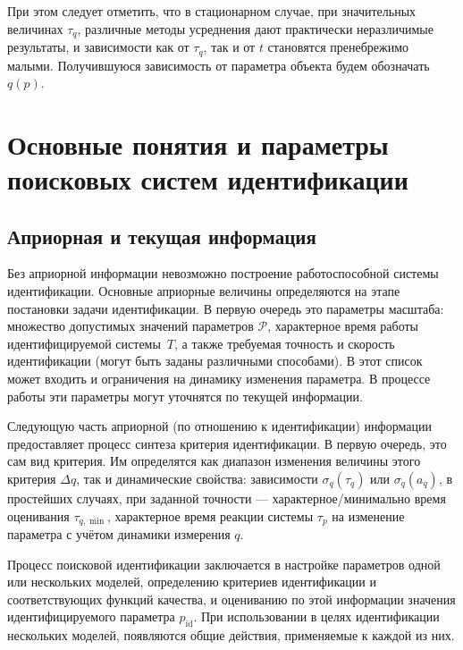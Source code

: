 При этом следует отметить, что в стационарном случае, при значительных величинах $\tau_q$,
различные методы усреднения дают практически неразличимые результаты, и зависимости
как от $\tau_q$, так и от $t$ становятся пренебрежимо малыми.
Получившуюся зависимость от параметра объекта будем обозначать $q(p)$.







\section{Основные понятия и параметры поисковых систем идентификации}  %

\subsection{Априорная и текущая информация}  %

Без априорной информации невозможно построение
работоспособной системы идентификации. Основные
априорные величины определяются на этапе постановки
задачи идентификации. В первую очередь это
параметры масштаба: множество допустимых
значений параметров \label{atu:d:p_set}\( \mathcal{P}\),
характерное время работы
идентифицируемой системы~$T$, а также
требуемая точность и скорость идентификации
(могут быть заданы различными способами).
В этот список может входить и ограничения на динамику изменения параметра.
В процессе работы эти параметры могут уточнятся по текущей информации.

Следующую часть априорной (по отношению к идентификации) информации
предоставляет процесс синтеза критерия идентификации.
В первую очередь, это сам вид критерия. Им определятся
как диапазон изменения величины этого критерия $\Delta q$, так и
динамические свойства:
зависимости $\sigma_q(\tau_q)$ или  $\sigma_q(a_q)$,
в простейших случаях, при заданной точности --- характерное/минимально время
оценивания \(\tau_{q,\min}\),
характерное время реакции системы $\tau_p$ на изменение
параметра с учётом динамики измерения \(q\).

Процесс поисковой идентификации заключается в настройке параметров одной
или нескольких моделей, определению критериев идентификации
и соответствующих функций качества, и оцениванию по этой информации
значения идентифицируемого параметра \label{atu:d:p_id}$p_\mathrm{id}$.
При использовании в целях идентификации нескольких моделей,
появляются общие действия, применяемые к каждой из них.

